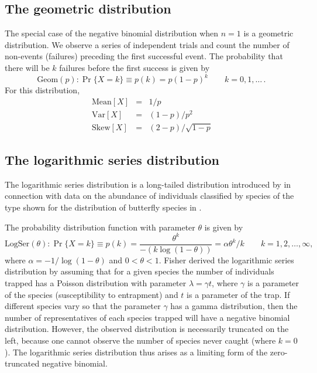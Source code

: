 \subsection{The geometric distribution}
The special case of the negative binomial distribution when $n=1$
is a geometric distribution.
We observe a series of independent trials and count the number
of non-events (failures) preceding the first successful event.
The probability that there will be  $k$ failures before the first
success
is given by
\begin{equation}\label{eq:geomf}
\textrm{Geom}(p):   \Pr \{ X = k \} \equiv p ( k )  =
   p (1-p)^k
  \quad\quad k = 0, 1, \dots
  \period
\end{equation}
For this distribution,
\begin{eqnarray*}
\textrm{Mean}[X] & = & 1 / p\\
\textrm{Var}[X] &  = & (1-p) / p^2 \\
\textrm{Skew}[X] & = & (2-p) / \sqrt{1-p}
\end{eqnarray*}

\subsection{The logarithmic series distribution}
The logarithmic series distribution is a long-tailed distribution
introduced by
\citet{Fisher-etal:43}
in connection with data on the abundance of individuals
classified by species of the type shown for the distribution of butterfly
species
in .

The probability distribution function with parameter $\theta$ is given by
\begin{equation}\label{eq:logseriesf}
\textrm{LogSer}(\theta): \Pr \{ X = k \} \equiv p ( k )  =
\frac{\theta ^k}{-(k\log (1-\theta ))} =
\alpha \theta^k / k
\quad\quad k = 1, 2, \dots, \infty
\comma
\end{equation}
where $\alpha = -1 / \log(1 - \theta)$
and $0 < \theta <1$.
Fisher derived the logarithmic series distribution by assuming that
for a given species the number of individuals trapped has a Poisson
distribution with parameter $\lambda = \gamma t$, where
$\gamma$ is a parameter of the species (susceptibility to entrapment)
and $t$ is a parameter of the trap.
If different species vary so that the parameter $\gamma$ has a gamma
distribution, then the number of representatives of each species trapped
will have a negative binomial distribution.
However, the observed distribution is necessarily truncated on the left,
because one cannot observe the number of species never caught (where $k=0$).
The logarithmic series distribution thus arises as a limiting form of the
zero-truncated negative binomial.

